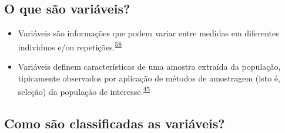 \documentclass[
  a4paper,
]{book}
\begin{document}
\hypertarget{o-que-suxe3o-variuxe1veis}{%
\subsection{O que são variáveis?}\label{o-que-suxe3o-variuxe1veis}}

\begin{itemize}
\item
  Variáveis são informações que podem variar entre medidas em diferentes indivíduos e/ou repetições.\textsuperscript{\protect\hyperlink{ref-Altman1999}{58}}
\item
  Variáveis definem características de uma amostra extraída da população, tipicamente observados por aplicação de métodos de amostragem (isto é, seleção) da população de interesse.\textsuperscript{\protect\hyperlink{ref-vetter2017}{45}}
\end{itemize}

\hypertarget{como-suxe3o-classificadas-as-variuxe1veis}{%
\subsection{Como são classificadas as variáveis?}\label{como-suxe3o-classificadas-as-variuxe1veis}}
\end{document}
